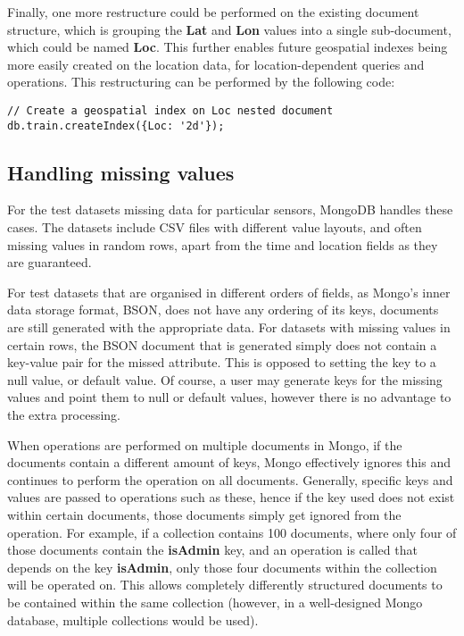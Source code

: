 \documentclass[a4paper,11pt]{article}
\begin{document}
Finally, one more restructure could be performed on the existing document structure, which is grouping the \textbf{Lat}
and \textbf{Lon} values into a single sub-document, which could be named \textbf{Loc}. This further enables future
geospatial indexes being more easily created on the location data, for location-dependent queries and operations.
This restructuring can be performed by the following code:

\begin{lstlisting}
// Create a geospatial index on Loc nested document
db.train.createIndex({Loc: '2d'});
\end{lstlisting}


\subsection{Handling missing values} %
\label{sub:handling_missing_values}

For the test datasets missing data for particular sensors, MongoDB handles these cases. The datasets include
CSV files with different value layouts, and often missing values in random rows, apart from the time and location fields
as they are guaranteed.

For test datasets that are organised in different orders of fields, as Mongo's inner data storage format, BSON, does
not have any ordering of its keys, documents are still generated with the appropriate data. For datasets with missing
values in certain rows, the BSON document that is generated simply does not contain a key-value pair for the missed
attribute. This is opposed to setting the key to a null value, or default value. Of course, a user may generate keys
for the missing values and point them to null or default values, however there is no advantage to the extra processing.

When operations are performed on multiple documents in Mongo, if the documents contain a different amount of keys, Mongo
effectively ignores this and continues to perform the operation on all documents. Generally, specific keys and values
are passed to operations such as these, hence if the key used does not exist within certain documents, those documents
simply get ignored from the operation. For example, if a collection contains 100 documents, where only four of those
documents contain the \textbf{isAdmin} key, and an operation is called that depends on the key \textbf{isAdmin}, only
those four documents within the collection will be operated on. This allows completely differently structured documents
to be contained within the same collection (however, in a well-designed Mongo database, multiple collections would be used).
\end{document}
